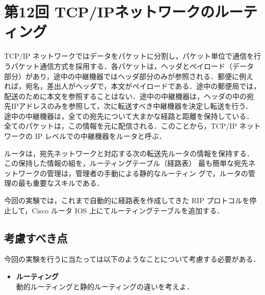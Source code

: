 \section{第12回 TCP/IPネットワークのルーティング}

TCP/IP ネットワークではデータをパケットに分割し，パケット単位で通信を行
うパケット通信方式を採用する．各パケットは，ヘッダとペイロード（データ
部分）があり，途中の中継機器ではヘッダ部分のみが参照される．郵便に例え
れば，宛名，差出人がヘッダで，本文がペイロードである．途中の郵便局では，
配送のために本文を参照することはない．途中の中継機器は，ヘッダの中の宛
先IPアドレスのみを参照して，次に転送すべき中継機器を決定し転送を行う．
途中の中継機器は，全ての宛先について大まかな経路と距離を保持している．
全てのパケットは，この情報を元に配信される．このことから，TCP/IP ネット
ワークの IP レベルでの中継機器をルータと呼ぶ．

ルータは，宛先ネットワークと対応する次の転送先ルータの情報を保持する．
この保持した情報の組を，ルーティングテーブル（経路表）
最も簡単な宛先ネットワークの管理は，管理者の手動による静的なルーティン
グで，ルータの管理の最も重要なスキルである．

今回の実験では，これまで自動的に経路表を作成してきた RIP プロトコルを停
止して，Cisco ルータ IOS 上にてルーティングテーブルを追加する．

\subsection*{考慮すべき点}
今回の実験を行うに当たっては以下のようなことについて考慮する必要がある．
\begin{itemize}
  \item \textbf{ルーティング}\\
    動的ルーティングと静的ルーティングの違いを考えよ．\\
\end{itemize}

